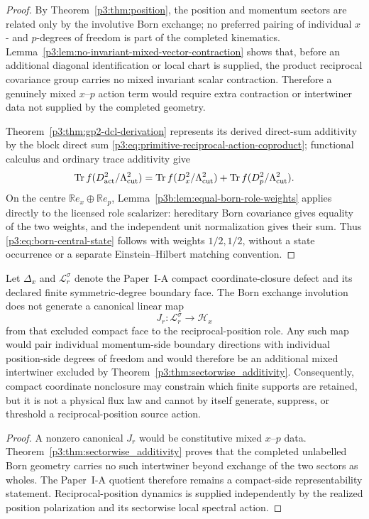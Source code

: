 \documentclass[12pt,a4paper]{article}
\begin{document}
\begin{proof}
By Theorem~\ref{p3:thm:position}, the position and momentum sectors are related
only by the involutive Born exchange; no preferred pairing of individual
\(x\)- and \(p\)-degrees of freedom is part of the completed kinematics.
Lemma~\ref{p3:lem:no-invariant-mixed-vector-contraction} shows that, before an
additional diagonal identification or local chart is supplied, the
product reciprocal covariance group carries no mixed invariant scalar
contraction.  Therefore a genuinely mixed \(x\)--\(p\) action term would
require extra contraction or intertwiner data not supplied by the completed
geometry.

Theorem~\ref{p3:thm:gp2-dcl-derivation} represents its derived direct-sum additivity by
the block direct sum
\eqref{p3:eq:primitive-reciprocal-action-coproduct}; functional calculus and
ordinary trace additivity give
\[
 \operatorname{Tr} f(D_{\rm act}^2/\Lambda_{\mathrm{cut}}^2)
 =\operatorname{Tr} f(D_x^2/\Lambda_{\mathrm{cut}}^2)+\operatorname{Tr} f(D_p^2/\Lambda_{\mathrm{cut}}^2).
\]
On the centre \(\mathbb Re_x\oplus\mathbb Re_p\),
Lemma~\ref{p3b:lem:equal-born-role-weights} applies directly to the licensed
role scalarizer: hereditary Born covariance gives equality of the two weights,
and the independent unit normalization gives their sum.  Thus
\eqref{p3:eq:born-central-state} follows with weights \(1/2,1/2\), without a
state occurrence or a separate Einstein--Hilbert matching convention.
\end{proof}

\begin{corollary}
\label{p3:cor:no-boundary-to-position-transfer}
Let \(\Delta_x\) and \(\mathcal L_r^\sigma\) denote the Paper~I-A compact
coordinate-closure defect and its declared finite symmetric-degree boundary
face.  The Born exchange involution does not generate a canonical linear map
\[
  J_r:\mathcal L_r^\sigma\longrightarrow\mathcal H_x
\]
from that excluded compact face to the reciprocal-position role.  Any such
map would pair individual momentum-side boundary directions with individual
position-side degrees of freedom and would therefore be an additional mixed
intertwiner excluded by Theorem~\ref{p3:thm:sectorwise_additivity}.
Consequently, compact coordinate nonclosure may constrain which finite
supports are retained, but it is not a physical flux law and cannot by itself
generate, suppress, or threshold a reciprocal-position source action.
\end{corollary}

\begin{proof}
A nonzero canonical \(J_r\) would be constitutive mixed \(x\)--\(p\) data.
Theorem~\ref{p3:thm:sectorwise_additivity} proves that the completed unlabelled
Born geometry carries no such intertwiner beyond exchange of the two sectors
as wholes.  The Paper~I-A quotient therefore remains a compact-side
representability statement.  Reciprocal-position dynamics is supplied
independently by the realized position polarization and its sectorwise local
spectral action.
\end{proof}
\end{document}
